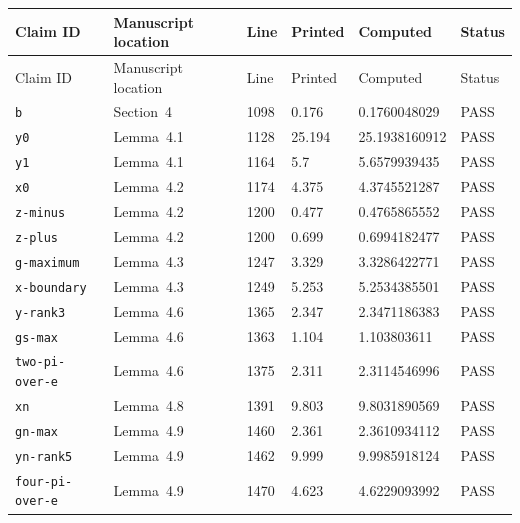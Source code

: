 {\footnotesize
\setlength{\tabcolsep}{2pt}
\begin{longtable}{@{}p{36mm}p{39mm}p{9mm}p{14mm}p{27mm}p{12mm}@{}}
\toprule
Claim ID & Manuscript location & Line & Printed & Computed & Status \\
\midrule\endfirsthead
\toprule
Claim ID & Manuscript location & Line & Printed & Computed & Status \\
\midrule\endhead
\bottomrule\endfoot
\nolinkurl{b} & Section~4 & 1098 & 0.176 & 0.1760048029 & PASS \\
\nolinkurl{y0} & Lemma~4.1 & 1128 & 25.194 & 25.1938160912 & PASS \\
\nolinkurl{y1} & Lemma~4.1 & 1164 & 5.7 & 5.6579939435 & PASS \\
\nolinkurl{x0} & Lemma~4.2 & 1174 & 4.375 & 4.3745521287 & PASS \\
\nolinkurl{z-minus} & Lemma~4.2 & 1200 & 0.477 & 0.4765865552 & PASS \\
\nolinkurl{z-plus} & Lemma~4.2 & 1200 & 0.699 & 0.6994182477 & PASS \\
\nolinkurl{g-maximum} & Lemma~4.3 & 1247 & 3.329 & 3.3286422771 & PASS \\
\nolinkurl{x-boundary} & Lemma~4.3 & 1249 & 5.253 & 5.2534385501 & PASS \\
\nolinkurl{y-rank3} & Lemma~4.6 & 1365 & 2.347 & 2.3471186383 & PASS \\
\nolinkurl{gs-max} & Lemma~4.6 & 1363 & 1.104 & 1.103803611 & PASS \\
\nolinkurl{two-pi-over-e} & Lemma~4.6 & 1375 & 2.311 & 2.3114546996 & PASS \\
\nolinkurl{xn} & Lemma~4.8 & 1391 & 9.803 & 9.8031890569 & PASS \\
\nolinkurl{gn-max} & Lemma~4.9 & 1460 & 2.361 & 2.3610934112 & PASS \\
\nolinkurl{yn-rank5} & Lemma~4.9 & 1462 & 9.999 & 9.9985918124 & PASS \\
\nolinkurl{four-pi-over-e} & Lemma~4.9 & 1470 & 4.623 & 4.6229093992 & PASS \\
\end{longtable}
}
